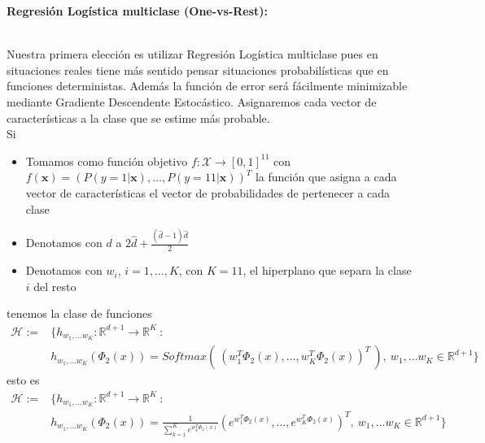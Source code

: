 \documentclass[11pt,a4paper]{article}
\theoremstyle{definition}
\newcommand{\R}{\mathbb{R}}
\begin{document}
	\textbf{Regresión Logística multiclase (One-vs-Rest):} $\quad \quad \quad \quad \quad \quad \quad \quad \quad \quad \quad \quad \quad \quad \quad \quad \quad  $ %
	
	Nuestra primera elección es utilizar Regresión Logística multiclase pues en situaciones reales tiene más sentido pensar situaciones probabilísticas que en funciones deterministas. Además la función de error será fácilmente minimizable mediante Gradiente Descendente Estocástico. Asignaremos cada vector de características a la clase que se estime más probable.\\
	
	Si 
	\begin{itemize}
	\item Tomamos como función objetivo $f\colon \mathcal{X} \to [0,1]^{11}$ con $f(\mathbf{x})=(P(y=1|\mathbf{x}),\ldots, P(y=11|\mathbf{x}))^T$ la función que asigna a cada vector de características el vector de probabilidades de pertenecer a cada clase 
	\item Denotamos con $d$ a $2\hat d + \frac{(\hat d -1)\hat d}{2}$
	\item Denotamos con $w_i$, $i=1,\ldots , K$, con $K=11$, el hiperplano que separa la clase $i$ del resto
	\end{itemize}
	tenemos la clase de funciones
	\begin{equation*}
\begin{aligned}
\mathcal{H}:= & \Big\{h_{w_1,\ldots w_K} \colon \R^{d+1} \to \R^K \ : \\
      & h_{w_1,\ldots w_K} (\Phi_2(x))=Softmax(\ (w_1^T \Phi_2(x), \ldots, w_K^T \Phi_2(x))^T \ ),\ w_1,\ldots w_K \in \R^{d+1}\Big\}
      \end{aligned}
\end{equation*}
	esto es
      \begin{equation*}
\begin{aligned}
      \mathcal{H}:=& \Big\{h_{w_1,\ldots w_K} \colon \R^{d+1} \to \R^K \ :\\
      & h_{w_1,\ldots w_K} (\Phi_2(x))=\frac{1}{\sum_{k=1}^K e^{w_k^T\Phi_2(x)}}(e^{w_1^T \Phi_2(x)}, \ldots, e^{w_K^T \Phi_2(x)})^T,\ w_1,\ldots w_K \in \R^{d+1}\Big\}
\end{aligned}
\end{equation*}
	
\end{document}
